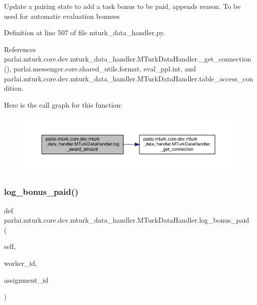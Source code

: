 \begin{DoxyVerb}Update a pairing state to add a task bonus to be paid,
appends reason. To be used for automatic evaluation bonuses
\end{DoxyVerb}
 

Definition at line 507 of file mturk\+\_\+data\+\_\+handler.\+py.



References parlai.\+mturk.\+core.\+dev.\+mturk\+\_\+data\+\_\+handler.\+M\+Turk\+Data\+Handler.\+\_\+get\+\_\+connection(), parlai.\+messenger.\+core.\+shared\+\_\+utils.\+format, eval\+\_\+ppl.\+int, and parlai.\+mturk.\+core.\+dev.\+mturk\+\_\+data\+\_\+handler.\+M\+Turk\+Data\+Handler.\+table\+\_\+access\+\_\+condition.

Here is the call graph for this function\+:
\nopagebreak
\begin{figure}[H]
\begin{center}
\leavevmode
\includegraphics[width=350pt]{classparlai_1_1mturk_1_1core_1_1dev_1_1mturk__data__handler_1_1MTurkDataHandler_a70ba0bf16c83138626c33c71a041674f_cgraph}
\end{center}
\end{figure}
\mbox{\label{classparlai_1_1mturk_1_1core_1_1dev_1_1mturk__data__handler_1_1MTurkDataHandler_aaa2ae4ebfd4b668bdef7642cdf4d9392}} 
\subsubsection{\texorpdfstring{log\+\_\+bonus\+\_\+paid()}{log\_bonus\_paid()}}
{\footnotesize\ttfamily def parlai.\+mturk.\+core.\+dev.\+mturk\+\_\+data\+\_\+handler.\+M\+Turk\+Data\+Handler.\+log\+\_\+bonus\+\_\+paid (\begin{DoxyParamCaption}\item[{}]{self,  }\item[{}]{worker\+\_\+id,  }\item[{}]{assignment\+\_\+id }\end{DoxyParamCaption})}

